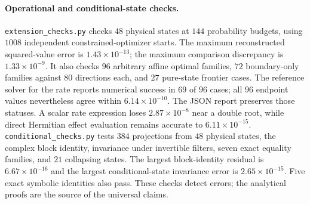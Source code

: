 \documentclass[11pt]{article}
\theoremstyle{remark}\newtheorem{remark}[theorem]{Remark}
\begin{document}
\paragraph{Operational and conditional-state checks.}
\texttt{extension\_checks.py} checks $48$ physical states at $144$
probability budgets, using $1008$ independent constrained-optimizer starts.
The maximum reconstructed squared-value error is $1.43\times10^{-13}$;
the maximum comparison discrepancy is $1.33\times10^{-9}$.
It also checks $96$ arbitrary affine optimal families, $72$ boundary-only
families against $80$ directions each, and $27$ pure-state frontier cases.
The reference solver for the rate reports numerical success in $69$ of
$96$ cases; all $96$ endpoint values nevertheless agree within
$6.14\times10^{-10}$. The JSON report preserves those statuses.
A scalar rate expression loses $2.87\times10^{-8}$ near a double root,
while direct Hermitian effect evaluation remains accurate to
$6.11\times10^{-15}$.
\texttt{conditional\_checks.py} tests $384$ projections from $48$ physical
states, the complex block identity, invariance under invertible filters,
seven exact equality families, and $21$ collapsing states. The largest
block-identity residual is $6.67\times10^{-16}$ and the largest
conditional-state invariance error is $2.65\times10^{-15}$. Five exact
symbolic identities also pass. These checks detect errors; the analytical
proofs are the source of the universal claims.


\end{document}
